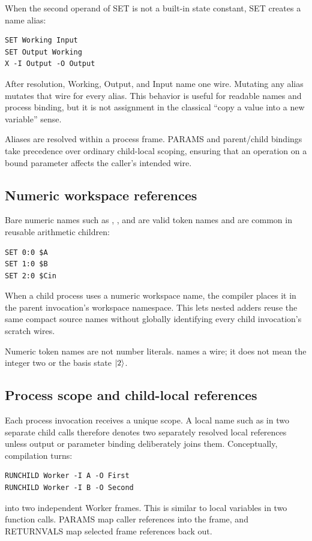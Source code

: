 When the second operand of SET is not a built-in state constant, SET creates a
name alias:
\begin{lstlisting}
SET Working Input
SET Output Working
X -I Output -O Output
\end{lstlisting}
After resolution, Working, Output, and Input name one wire. Mutating any alias
mutates that wire for every alias. This behavior is useful for readable names
and process binding, but it is not assignment in the classical
``copy a value into a new variable'' sense.

Aliases are resolved within a process frame. PARAMS and parent/child bindings
take precedence over ordinary child-local scoping, ensuring that an operation
on a bound parameter affects the caller's intended wire.

\subsection{Numeric workspace references}

Bare numeric names such as , , and  are valid token
names and are common in reusable arithmetic children:
\begin{lstlisting}
SET 0:0 $A
SET 1:0 $B
SET 2:0 $Cin
\end{lstlisting}
When a child process uses a numeric workspace name, the compiler places it in
the parent invocation's workspace namespace. This lets nested adders reuse the
same compact source names without globally identifying every child invocation's
scratch wires.

Numeric token names are not number literals.  names a wire; it does not
mean the integer two or the basis state $\lvert 2\rangle$.

\subsection{Process scope and child-local references}

Each process invocation receives a unique scope. A local name such as
 in two separate child calls therefore denotes two separately
resolved local references unless output or parameter binding deliberately joins
them. Conceptually, compilation turns:
\begin{lstlisting}
RUNCHILD Worker -I A -O First
RUNCHILD Worker -I B -O Second
\end{lstlisting}
into two independent Worker frames. This is similar to local variables in two
function calls. PARAMS map caller references into the frame, and RETURNVALS map
selected frame references back out.

